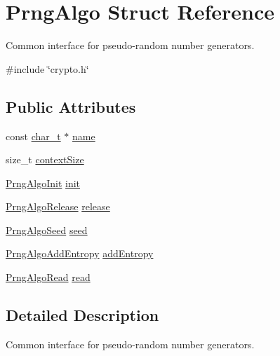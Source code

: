 \hypertarget{structPrngAlgo}{}\section{Prng\+Algo Struct Reference}
\label{structPrngAlgo}


Common interface for pseudo-\/random number generators.  




{\ttfamily \#include \char`\"{}crypto.\+h\char`\"{}}

\subsection*{Public Attributes}
\begin{DoxyCompactItemize}
\item 
const \hyperlink{compiler__port_8h_a40bb5262bf908c328fbcfbe5d29d0201}{char\+\_\+t} $\ast$ \hyperlink{structPrngAlgo_a356764e8ce05dcc4ebe9fc09ec51f4a7}{name}
\item 
size\+\_\+t \hyperlink{structPrngAlgo_afa5f00aea3bcb893e569a5b2b17cacff}{context\+Size}
\item 
\hyperlink{cyclone__crypto_2core_2crypto_8h_ab49454c4c68dfc5734a75010fbc7ec50}{Prng\+Algo\+Init} \hyperlink{structPrngAlgo_a236d51b2333e3ec0cfdd1e69b5b16d8b}{init}
\item 
\hyperlink{cyclone__crypto_2core_2crypto_8h_aa2ab13cb1a30eadf81230ab08c00fc8c}{Prng\+Algo\+Release} \hyperlink{structPrngAlgo_ab1491a5c482466d6fa69254439f192d7}{release}
\item 
\hyperlink{cyclone__crypto_2core_2crypto_8h_a66d430d5b8d0932d87b832ca8cf12e19}{Prng\+Algo\+Seed} \hyperlink{structPrngAlgo_a8d064e28220160c9f6b90c606ab957fe}{seed}
\item 
\hyperlink{cyclone__crypto_2core_2crypto_8h_a7a1131568c9968297240a339611528b6}{Prng\+Algo\+Add\+Entropy} \hyperlink{structPrngAlgo_ac77eb291fb759f30bbeccf320648dc45}{add\+Entropy}
\item 
\hyperlink{cyclone__crypto_2core_2crypto_8h_a533acba5eee0f4988acd735a20b36993}{Prng\+Algo\+Read} \hyperlink{structPrngAlgo_a079621740ef14faacfcd05b84c9036eb}{read}
\end{DoxyCompactItemize}


\subsection{Detailed Description}
Common interface for pseudo-\/random number generators. 

